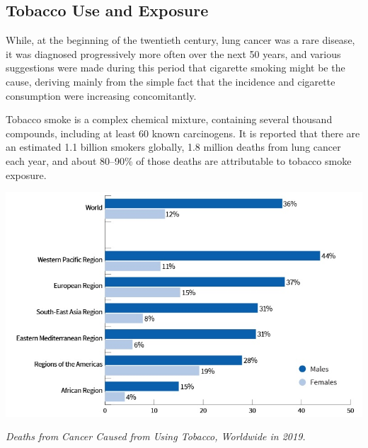 
\subsection{Tobacco Use and Exposure}

While, at the beginning of the twentieth century, lung cancer was a rare disease, it was diagnosed 
progressively more often over the next 50 years, and various suggestions were made during this 
period that cigarette smoking might be the cause, deriving mainly from the simple fact that the 
incidence and cigarette consumption were increasing concomitantly.\cite{Lee17} 

Tobacco smoke is a complex chemical mixture, containing several thousand compounds, including at 
least 60 known carcinogens. It is reported that there are an estimated 1.1 billion smokers globally, 
1.8 million deaths from lung cancer each year, and about 80–90\% of those deaths are attributable to 
tobacco smoke exposure. \cite{JOUR}

\vspace{1em}
\begin{center} 
    \includegraphics[width=\textwidth]{../assets/02-etiology/table-tobacco-use-by-country copy.jpg}

    \small\textit{Deaths from Cancer Caused from Using Tobacco, Worldwide in 2019. \cite{sandy2021}}
\end{center}
\vspace{1em} 

